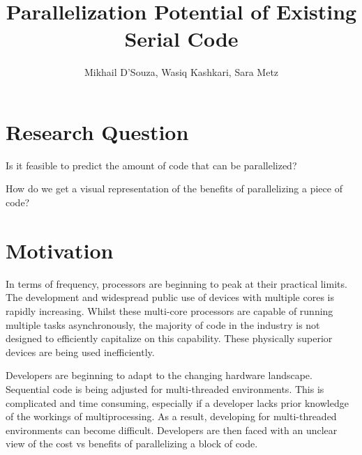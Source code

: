 \documentclass[a4paper]{article}
\begin{document}
\title{Parallelization Potential of Existing Serial Code}
\author{Mikhail D'Souza, Wasiq Kashkari, Sara Metz}
\maketitle


\section{Research Question}
\begin{description}
\item Is it feasible to predict the amount of code that can be parallelized?
\item How do we get a visual representation of the benefits of parallelizing a
piece of code?
\end{description}

\section{Motivation}
In terms of frequency, processors are beginning to peak at their practical
limits. The development and widespread public use of devices with
multiple cores is rapidly increasing. Whilst these multi-core processors are
capable of running multiple tasks asynchronously, the majority of code in the
industry is not designed to efficiently capitalize on this capability. These
physically superior devices are being used inefficiently.

Developers are beginning to adapt to the changing hardware landscape.
Sequential code is being adjusted for multi-threaded environments. This is
complicated and time consuming, especially if a developer lacks prior knowledge
of the workings of multiprocessing. As a result, developing for multi-threaded
environments can become difficult. Developers are then faced with an unclear
view of the cost vs benefits of parallelizing a block of code.
\end{document}
